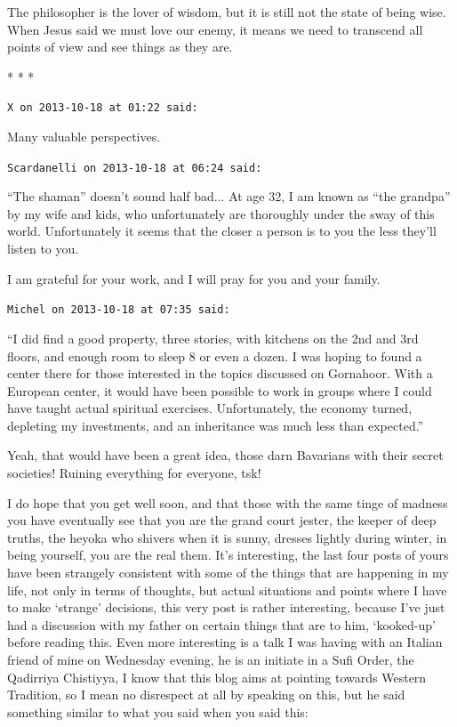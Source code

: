The philosopher is the lover of wisdom, but it is still not the state of being wise. When Jesus said we must love our enemy, it means we need to transcend all points of view and see things as they are.



\begin{center}* * *\end{center}

\begin{footnotesize}
\begin{sffamily}
\texttt{X on 2013-10-18 at 01:22 said:}

Many valuable perspectives.

\hfill

\texttt{Scardanelli on 2013-10-18 at 06:24 said:}

``The shaman'' doesn't sound half bad... At age 32, I am known as ``the grandpa'' by my wife and kids, who unfortunately are thoroughly under the sway of this world. Unfortunately it seems that the closer a person is to you the less they'll listen to you.

I am grateful for your work, and I will pray for you and your family.

\hfill

\texttt{Michel on 2013-10-18 at 07:35 said:}

``I did find a good property, three stories, with kitchens on the 2nd and 3rd floors, and enough room to sleep 8 or even a dozen. I was hoping to found a center there for those interested in the topics discussed on Gornahoor. With a European center, it would have been possible to work in groups where I could have taught actual spiritual exercises. Unfortunately, the economy turned, depleting my investments, and an inheritance was much less than expected.''

Yeah, that would have been a great idea, those darn Bavarians with their secret societies! Ruining everything for everyone, tsk!

I do hope that you get well soon, and that those with the same tinge of madness you have eventually see that you are the grand court jester, the keeper of deep truths, the heyoka who shivers when it is sunny, dresses lightly during winter, in being yourself, you are the real them. It's interesting, the last four posts of yours have been strangely consistent with some of the things that are happening in my life, not only in terms of thoughts, but actual situations and points where I have to make `strange' decisions, this very post is rather interesting, because I've just had a discussion with my father on certain things that are to him, `kooked-up' before reading this. Even more interesting is a talk I was having with an Italian friend of mine on Wednesday evening, he is an initiate in a Sufi Order, the Qadirriya Chistiyya, I know that this blog aims at pointing towards Western Tradition, so I mean no disrespect at all by speaking on this, but he said something similar to what you said when you said this:


\end{sffamily}
\end{footnotesize}
